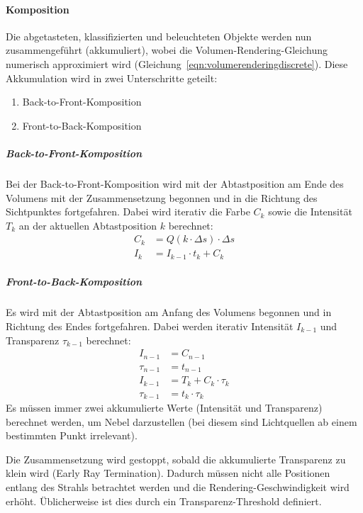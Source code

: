 			\paragraph{Komposition}
				Die abgetasteten, klassifizierten und beleuchteten Objekte werden nun zusammengeführt (akkumuliert), wobei die Volumen-Rendering-Gleichung numerisch approximiert wird (Gleichung~\ref{eqn:volumerenderingdiscrete}). Diese Akkumulation wird in zwei Unterschritte geteilt:
				\begin{enumerate}
					\item Back-to-Front-Komposition
					\item Front-to-Back-Komposition
				\end{enumerate}

				\subparagraph{Back-to-Front-Komposition}
					Bei der Back-to-Front-Komposition wird mit der Abtastposition am Ende des Volumens mit der Zusammensetzung begonnen und in die Richtung des Sichtpunktes fortgefahren. Dabei wird iterativ die Farbe \( C_k \) sowie die Intensität \( T_k \) an der aktuellen Abtastposition \( k \) berechnet:
					\begin{align*}
						C_k &= Q(k \cdot \Delta s) \cdot \Delta s \\
						I_k &= I_{k - 1} \cdot t_k + C_k
					\end{align*}

				\subparagraph{Front-to-Back-Komposition}
					Es wird mit der Abtastposition am Anfang des Volumens begonnen und in Richtung des Endes fortgefahren. Dabei werden iterativ Intensität \( I_{k - 1} \) und Transparenz \( \tau_{k - 1} \) berechnet:
					\begin{align*}
						I_{n - 1} &= C_{n - 1} \\
						\tau_{n - 1} &= t_{n - 1} \\
						I_{k - 1} &= T_k + C_k \cdot \tau_k \\
						\tau_{k - 1} &= t_k \cdot \tau_k
					\end{align*}
					Es müssen immer zwei akkumulierte Werte (Intensität und Transparenz) berechnet werden, um \zB Nebel darzustellen (bei diesem sind Lichtquellen ab einem bestimmten Punkt irrelevant).
					
					Die Zusammensetzung wird gestoppt, sobald die akkumulierte Transparenz zu klein wird (Early Ray Termination). Dadurch müssen nicht alle Positionen entlang des Strahls betrachtet werden und die Rendering-Geschwindigkeit wird erhöht. Üblicherweise ist dies durch ein Transparenz-Threshold definiert.

